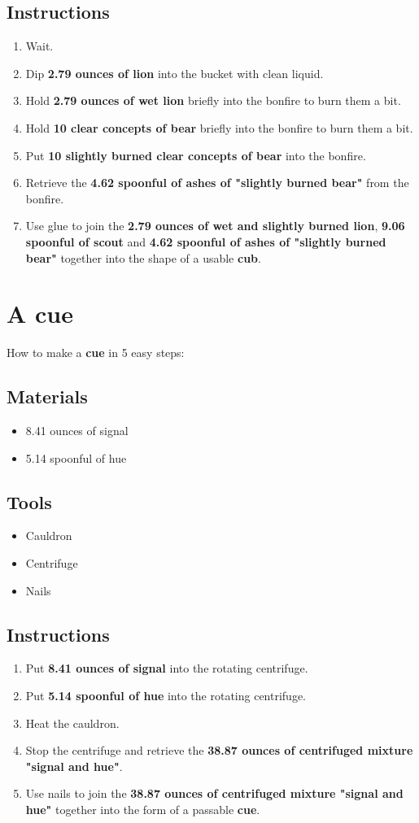 \documentclass{article}
\begin{document}
\subsection{Instructions}\begin{enumerate}
\item 
Wait.
\item 
Dip \textbf{2.79 ounces of lion} into the bucket with clean liquid.
\item 
Hold \textbf{2.79 ounces of wet lion} briefly into the bonfire to burn them a bit.
\item 
Hold \textbf{10 clear concepts of bear} briefly into the bonfire to burn them a bit.
\item 
Put \textbf{10 slightly burned clear concepts of bear} into the bonfire.
\item 
Retrieve the \textbf{4.62 spoonful of ashes of "slightly burned bear"} from the bonfire.
\item 
Use glue to join the \textbf{2.79 ounces of wet and slightly burned lion}, \textbf{9.06 spoonful of scout} and \textbf{4.62 spoonful of ashes of "slightly burned bear"} together into the shape of a usable \textbf{cub}.
\end{enumerate}
\newpage
\section{A cue}How to make a \textbf{cue} in 5 easy steps:

\subsection{Materials}\begin{itemize}
\item 
8.41 ounces of signal
\item 
5.14 spoonful of hue
\end{itemize}
\subsection{Tools}\begin{itemize}
\item 
Cauldron
\item 
Centrifuge
\item 
Nails
\end{itemize}
\subsection{Instructions}\begin{enumerate}
\item 
Put \textbf{8.41 ounces of signal} into the rotating centrifuge.
\item 
Put \textbf{5.14 spoonful of hue} into the rotating centrifuge.
\item 
Heat the cauldron.
\item 
Stop the centrifuge and retrieve the \textbf{38.87 ounces of centrifuged mixture "signal and hue"}.
\item 
Use nails to join the \textbf{38.87 ounces of centrifuged mixture "signal and hue"} together into the form of a passable \textbf{cue}.
\end{enumerate}
\newpage
\end{document}
